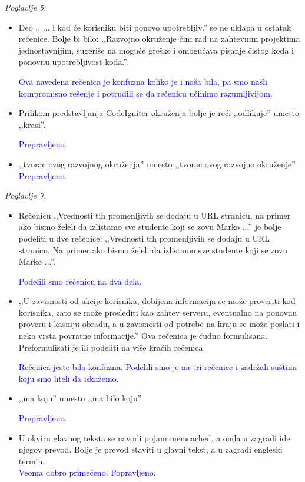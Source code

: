 \documentclass[a4paper]{report}
\newcommand{\odgovor}[1]{\textcolor{blue}{#1}}
\begin{document}
\textit{Poglavlje 5.}
\begin{itemize}
\item Deo ,, ... i kod će korisniku biti ponovo upotrebljiv.'' se ne uklapa u ostatak rečenice. Bolje bi bilo: ,,Razvojno okruženje čini rad na zahtevnim projektima jednostavnijim, sugeriše na moguće greške i omogućava pisanje čistog koda i ponovnu upotrebljivost koda.''.

\odgovor{Ova navedena rečenica je konfuzna koliko je i naša bila, pa smo našli kompromisno rešenje i potrudili se da rečenicu učinimo razumljivijom.}

\item Prilikom predstavljanja CodeIgniter okruženja bolje je reći ‚‚odlikuje'' umesto ‚‚krasi''.

\odgovor{Prepravljeno.}

\item ‚‚tvorac ovog razvojnog okruženja'' umesto ‚‚tvorac ovog razvojno okruženje''\\

\odgovor{Prepravljeno.}
\end{itemize}

\textit{Poglavlje 7.}
\begin{itemize}
\item Rečenicu ,,Vrednosti tih promenljivih se dodaju u URL stranicu, na primer ako bismo želeli da izlistamo sve studente koji se zovu Marko ...'' je bolje podeliti u dve rečenice: ,,Vrednosti tih promenljivih se dodaju u URL stranicu. Na primer ako bismo želeli da izlistamo sve studente koji se zovu Marko ...''.

\odgovor{Podelili smo rečenicu na dva dela.}

\item ,,U zavisnosti od akcije korisnika, dobijena informacija se može proveriti kod korisnika,
zato se može proslediti kao zahtev serveru, eventualno na ponovnu proveru i kasniju obradu, a u zavisnosti od potrebe na kraju se može poslati i neka vrsta povratne informacije.'' Ova rečenica je čudno formulisana. Preformulisati je ili podeliti na više kraćih rečenica.

\odgovor{Rečenica jeste bila konfuzna. Podelili smo je na tri rečenice i zadržali suštinu koju smo hteli da iskažemo.}

\item ,,ma koju'' umesto ,,ma bilo koju''

\odgovor{Prepravljeno.}

\item U okviru glavnog teksta se navodi pojam memcached, a onda u zagradi ide njegov prevod. Bolje je prevod staviti u glavni tekst, a u zagradi engleski termin.\\
\odgovor{Veoma dobro primećeno. Popravljeno.}

\end{itemize}
\end{document}
